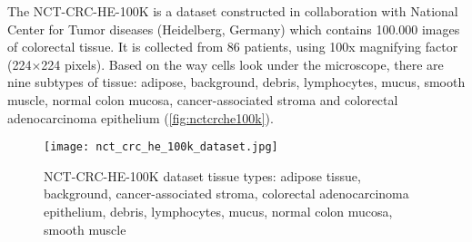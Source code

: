 The NCT-CRC-HE-100K \cite{kather_jakob_nikolas_2018_1214456} is a dataset constructed in collaboration with National Center for Tumor diseases (Heidelberg, Germany) which contains 100.000 images of colorectal tissue. It is collected from 86 patients, using 100x magnifying factor (224$\times$224 pixels). Based on the way cells look under the microscope, there are nine subtypes of tissue: adipose, background, debris, lymphocytes, mucus, smooth muscle, normal colon mucosa, cancer-associated stroma and colorectal adenocarcinoma epithelium (\textcolor{red}{\autoref{fig:nctcrche100k}}).

\begin{figure}[h]
	\centering
	\texttt{[image: nct\_crc\_he\_100k\_dataset.jpg]}
	\caption{NCT-CRC-HE-100K dataset tissue types: adipose tissue, background, cancer-associated stroma, colorectal adenocarcinoma epithelium, debris, lymphocytes, mucus, normal colon mucosa, smooth muscle}
	\label{fig:nctcrche100k}
\end{figure}
